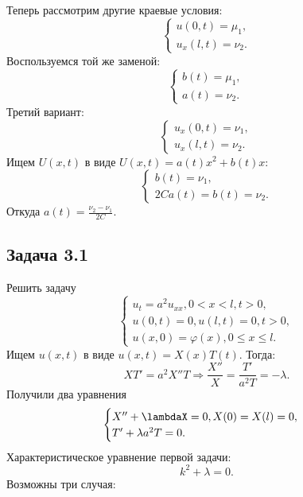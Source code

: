 \documentclass[11pt]{article}
\begin{document}
Теперь рассмотрим другие краевые условия:
\begin{equation}
\begin{cases}
u(0, t) = \mu_1, \\
u_x(l, t) = \nu_2.
\end{cases}
\end{equation}
Воспользуемся той же заменой:
\begin{equation}
\begin{cases}
b(t) = \mu_1, \\
a(t) = \nu_2.
\end{cases}
\end{equation}
Третий вариант:
\begin{equation}
\begin{cases}
u_x(0, t) = \nu_1, \\
u_x(l, t) = \nu_2.
\end{cases}
\end{equation}
Ищем $U(x, t)$ в виде $U(x, t) = a(t)x^2 + b(t)x$:
\begin{equation}
\begin{cases}
b(t) = \nu_1, \\
2Ca(t) = b(t) = \nu_2.
\end{cases}
\end{equation}
Откуда $a(t) = \frac{\nu_2 - \nu_1}{2C}$.
\subsection{Задача 3.1}
\label{sec:org3d7a4af}
Решить задачу
\begin{equation}
\begin{cases}
u_t = a^2u_{xx}, 0 < x < l, t > 0, \\
u(0, t) = 0, u(l, t) = 0, t > 0, \\
u(x, 0) = \varphi(x), 0 \leq x \leq l.
\end{cases}
\end{equation}
Ищем $u(x, t)$ в виде $u(x, t) = X(x)T(t)$. Тогда:
\begin{equation}
XT' = a^2X''T \Rightarrow \frac{X''}X = \frac{T'}{a^2T} = -\lambda.
\end{equation}
Получили два уравнения
\begin{equation}
\begin{cases}
X'' + \lambdaX = 0, X(0) = X(l) = 0, \\
T' + \lambda a^2T = 0.
\end{cases}
\end{equation}
Характеристическое уравнение первой задачи:
\begin{equation}
k^2 + \lambda = 0.
\end{equation}
Возможны три случая:
\end{document}
